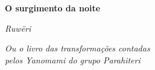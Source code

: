 

\begingroup\thispagestyle{empty}\vspace*{.05\textheight} 

              \formular
              \huge
              \noindent
              \textbf{O surgimento da noite}
              
              \vspace{0.3em}

              \noindent\Large\textit{Ruwëri}

              \vspace{0.6em}

              \noindent\normalsize\textit{Ou o livro das transformações contadas\\pelos Yanomami do  grupo Parahiteri}

\endgroup
\vfill
\pagebreak